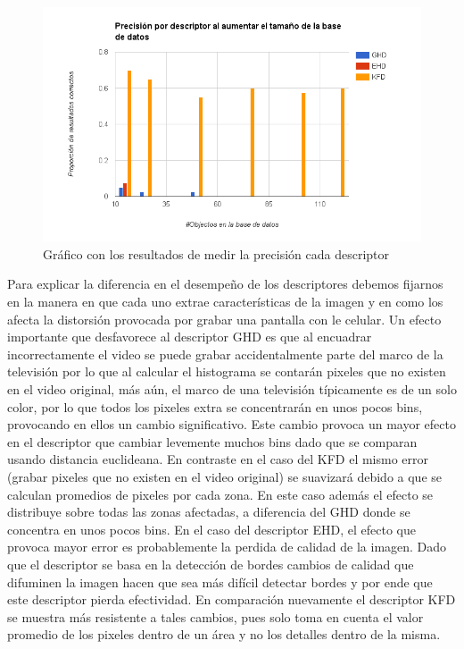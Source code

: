 	\begin{figure}[!h]
		\centering
		\includegraphics[width=\textwidth]{imagenes/cap5/resultados_precision.png}
		\caption{Gráfico con los resultados de medir la precisión cada descriptor}
		\label{resultados_precision}
	\end{figure}

Para explicar la diferencia en el desempeño de los descriptores debemos fijarnos en la manera en que cada uno extrae características de la imagen y en como los afecta la distorsión provocada por grabar una pantalla con le celular. Un efecto importante que desfavorece al descriptor GHD es que al encuadrar incorrectamente el video se puede grabar accidentalmente parte del marco de la televisión por lo que al calcular el histograma se contarán pixeles que no existen en el video original, más aún, el marco de una televisión típicamente es de un solo color, por lo que todos los pixeles extra se concentrarán en unos pocos bins, provocando en ellos un cambio significativo. Este cambio provoca un mayor efecto en el descriptor que cambiar levemente muchos bins dado que se comparan usando distancia euclideana. En contraste en el caso del KFD el mismo error (grabar pixeles que no existen en el video original) se suavizará debido a que se calculan promedios de pixeles por cada zona. En este caso además el efecto se distribuye sobre todas las zonas afectadas, a diferencia del GHD donde se concentra en unos pocos bins. 
En el caso del descriptor EHD, el efecto que provoca mayor error es probablemente la perdida de calidad de la imagen. Dado que el descriptor se basa en la detección de bordes cambios de calidad que difuminen la imagen hacen que sea más difícil detectar bordes y por ende que este descriptor pierda efectividad. En comparación nuevamente el descriptor KFD se muestra más resistente a tales cambios, pues solo toma en cuenta el valor promedio de los pixeles dentro de un área y no los detalles dentro de la misma.


